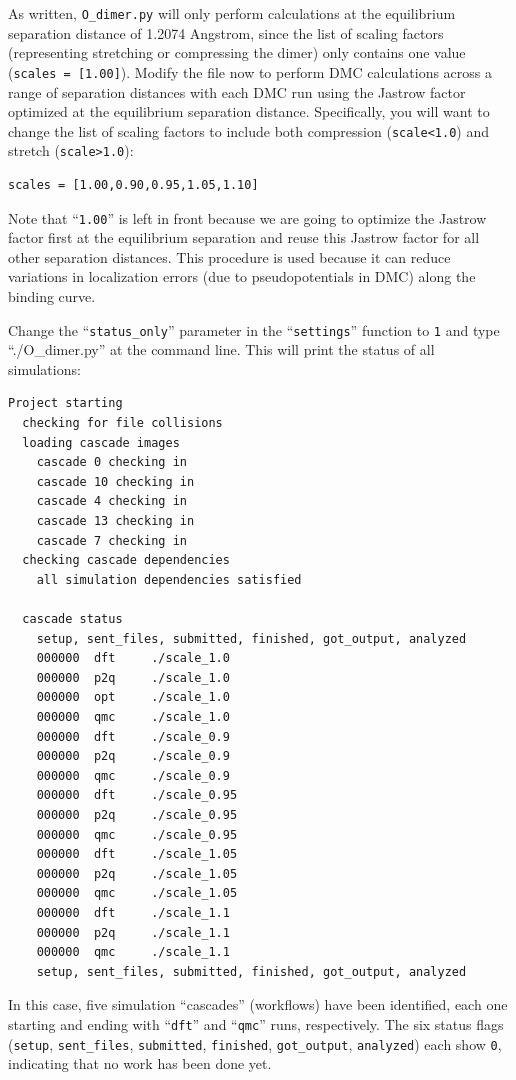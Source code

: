 As written, \texttt{O\_dimer.py} will only perform calculations at the equilibrium separation distance of 1.2074 Angstrom, since the list of scaling factors (representing stretching or compressing the dimer) only contains one value (\texttt{scales = [1.00]}).  Modify the file now to perform DMC calculations across a range of separation distances with each DMC run using the Jastrow factor optimized at the equilibrium separation distance.  Specifically, you will want to change the list of scaling factors to include both compression (\texttt{scale<1.0}) and stretch (\texttt{scale>1.0}): 
\begin{lstlisting}
scales = [1.00,0.90,0.95,1.05,1.10]
\end{lstlisting}
\noindent
Note that ``\texttt{1.00}'' is left in front because we are going to optimize the Jastrow factor first at the equilibrium separation and reuse this Jastrow factor for all other separation distances.  This procedure is used because it can reduce variations in localization errors (due to pseudopotentials in DMC) along the binding curve. 

Change the ``\texttt{status\_only}'' parameter in the ``\texttt{settings}'' function to \texttt{1} and type ``./O\_dimer.py'' at the command line.  This will print the status of all simulations:
\begin{shaded}
\begin{verbatim}
Project starting 
  checking for file collisions 
  loading cascade images 
    cascade 0 checking in 
    cascade 10 checking in 
    cascade 4 checking in 
    cascade 13 checking in 
    cascade 7 checking in 
  checking cascade dependencies 
    all simulation dependencies satisfied 
  
  cascade status 
    setup, sent_files, submitted, finished, got_output, analyzed 
    000000  dft     ./scale_1.0 
    000000  p2q     ./scale_1.0 
    000000  opt     ./scale_1.0 
    000000  qmc     ./scale_1.0 
    000000  dft     ./scale_0.9 
    000000  p2q     ./scale_0.9 
    000000  qmc     ./scale_0.9 
    000000  dft     ./scale_0.95 
    000000  p2q     ./scale_0.95 
    000000  qmc     ./scale_0.95 
    000000  dft     ./scale_1.05 
    000000  p2q     ./scale_1.05 
    000000  qmc     ./scale_1.05 
    000000  dft     ./scale_1.1 
    000000  p2q     ./scale_1.1 
    000000  qmc     ./scale_1.1 
    setup, sent_files, submitted, finished, got_output, analyzed 
\end{verbatim}
\end{shaded}
\noindent
In this case, five simulation ``cascades'' (workflows) have been identified, each one starting and ending with ``\texttt{dft}'' and ``\texttt{qmc}'' runs, respectively.  The six status flags (\texttt{setup}, \texttt{sent\_files}, \texttt{submitted}, \texttt{finished}, \texttt{got\_output}, \texttt{analyzed}) each show \texttt{0}, indicating that no work has been done yet.  

